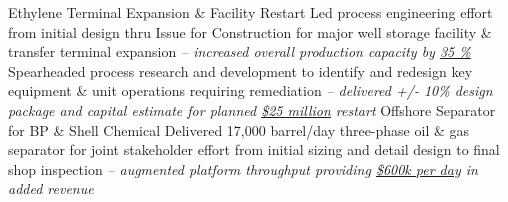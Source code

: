 %
%
%
%
%
\justifiedsubsection%
%
{Ethylene Terminal Expansion \& Facility Restart}
{}
%
\workitemsTwo%
%
{Led process engineering effort from initial design thru Issue for Construction for major well storage facility \& transfer terminal expansion 
\textit{%
-- increased overall production capacity by \underline{35 \%}}}
%
{Spearheaded process research and development to identify and redesign key equipment \& unit operations requiring remediation
\textit{%
-- delivered +/- 10\% design package and capital estimate for planned \underline{\$25 million} restart}}
\vspace{0.2em}
%
%
%
%
\justifiedsubsection%
%
{Offshore Separator for BP \& Shell Chemical}
{}
%
\workitemsOne%
%
{Delivered 17,000 barrel/day three-phase oil \& gas separator for joint stakeholder effort from initial sizing and detail design to final shop inspection
\textit{%
-- augmented platform throughput providing \underline{\$600k per day} in added revenue}}
%
%
%
%